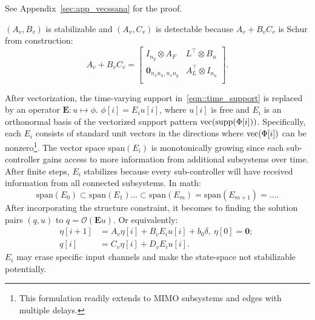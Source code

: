 See Appendix~\ref{sec:app_vecssana} for the proof.
\begin{rem}\label{rem::rationalsoln1} \((A_v,B_v)\) is stabilizable and \((A_v,C_v)\) is detectable because \(A_v+B_v C_v\) is Schur from construction:
\begin{equation}
    A_v+B_v C_v =  \left[
    \begin{array}{cc}
    I_{n_y}\otimes A_F &  L^\top\otimes B_u \\
    \mathbf{0}_{n_x n_u,n_x n_y} & A_L^\top\otimes I_{n_u} \\
    \end{array}\right].
\end{equation}  
\end{rem}


After vectorization, the time-varying support in~\eqref{eqn::time_support} is replaced by an operator $\mathbf{E}\colon u \mapsto \phi$. $\phi[i] = E_i u[i]$, where $u[i]$ is free and $E_i$ is an orthonormal basis of the vectorized support pattern ${\mathrm{vec}}({\mathrm{supp}}(\Phi[i]))$. Specifically, each $E_i$ consists of standard unit vectors in the directions where ${\mathrm{vec}}(\Phi[i])$ can be nonzero\footnote{This formulation readily extends to MIMO subsystems and edges with multiple delays.}. The vector space $\mathrm{span}(E_i)$ is monotonically growing since each sub-controller gains access to more information from additional subsystems over time. After finite steps, $E_i$ stabilizes because every sub-controller will have received information from all connected subsystems. In math:
\begin{equation*}\label{eqn::Ei_growth}
    \mathrm{span}(E_0)\subset\mathrm{span}(E_1)\hdots\subset\mathrm{span}(E_m) = \mathrm{span}(E_{m + 1}) = \hdots .
\end{equation*}
After incorporating the structure constraint, it becomes to finding the solution pairs \((q,u)\) to \(q = \mathcal{O}(\mathbf{E} u)\).
Or equivalently:
\begin{equation}\label{eqn:strct_vecss}
\begin{split}
    \eta[i+1] &=A_v \eta[i] +B_v E_i u[i] +b_0 \delta,\ \eta[0]=\mathbf{0};\ \\
    q[i] &= C_v \eta[i] +D_v E_i u[i].
\end{split}
\end{equation}
\(E_i\) may erase specific input channels and make the state-space not stabilizable potentially. 

